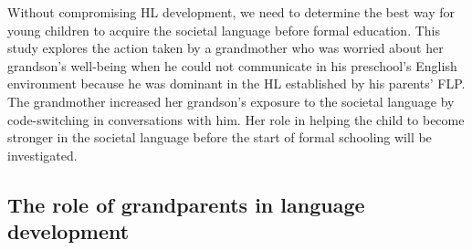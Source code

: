 \documentclass[output=paper,colorlinks,citecolor=brown]{langscibook}
\begin{document}
Without compromising HL development, we need to determine the best way for young children to acquire the societal language before formal education. This study explores the action taken by a grandmother who was worried about her grandson’s well-being when he could not communicate in his preschool’s English environment because he was dominant in the HL established by his parents’ FLP. The grandmother increased her grandson’s exposure to the societal language by code-switching in conversations with him. Her role in helping the child to become stronger in the societal language before the start of formal schooling will be investigated. 

\subsection{The role of grandparents in language development}\label{sec:quay:1.2}
\end{document}
